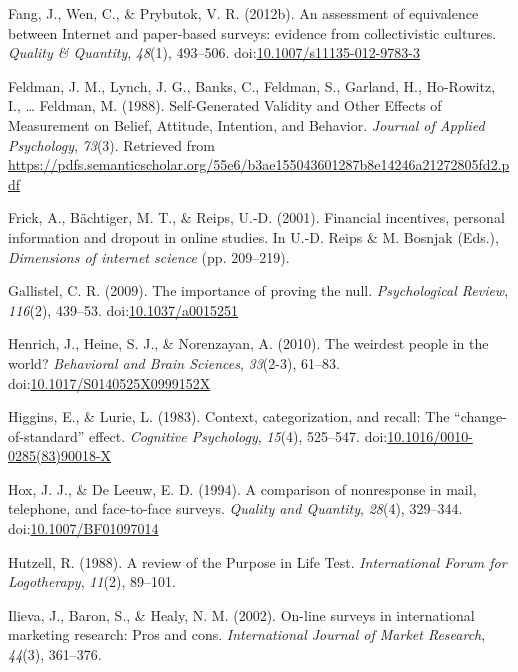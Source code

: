 \documentclass[english,man, mask]{apa6}
\theoremstyle{definition}
\theoremstyle{definition}
\theoremstyle{definition}
\theoremstyle{remark}
\begin{document}
\hypertarget{ref-Fang2012}{}
Fang, J., Wen, C., \& Prybutok, V. R. (2012b). An assessment of
equivalence between Internet and paper-based surveys: evidence from
collectivistic cultures. \emph{Quality \& Quantity}, \emph{48}(1),
493--506.
doi:\href{https://doi.org/10.1007/s11135-012-9783-3}{10.1007/s11135-012-9783-3}

\hypertarget{ref-Feldman1988}{}
Feldman, J. M., Lynch, J. G., Banks, C., Feldman, S., Garland, H.,
Ho-Rowitz, I., \ldots{} Feldman, M. (1988). Self-Generated Validity and
Other Effects of Measurement on Belief, Attitude, Intention, and
Behavior. \emph{Journal of Applied Psychology}, \emph{73}(3). Retrieved
from
\url{https://pdfs.semanticscholar.org/55e6/b3ae155043601287b8e14246a21272805fd2.pdf}

\hypertarget{ref-Frick2001}{}
Frick, A., Bächtiger, M. T., \& Reips, U.-D. (2001). Financial
incentives, personal information and dropout in online studies. In U.-D.
Reips \& M. Bosnjak (Eds.), \emph{Dimensions of internet science} (pp.
209--219).

\hypertarget{ref-Gallistel2009}{}
Gallistel, C. R. (2009). The importance of proving the null.
\emph{Psychological Review}, \emph{116}(2), 439--53.
doi:\href{https://doi.org/10.1037/a0015251}{10.1037/a0015251}

\hypertarget{ref-Henrich2010}{}
Henrich, J., Heine, S. J., \& Norenzayan, A. (2010). The weirdest people
in the world? \emph{Behavioral and Brain Sciences}, \emph{33}(2-3),
61--83.
doi:\href{https://doi.org/10.1017/S0140525X0999152X}{10.1017/S0140525X0999152X}

\hypertarget{ref-Higgins1983}{}
Higgins, E., \& Lurie, L. (1983). Context, categorization, and recall:
The ``change-of-standard'' effect. \emph{Cognitive Psychology},
\emph{15}(4), 525--547.
doi:\href{https://doi.org/10.1016/0010-0285(83)90018-X}{10.1016/0010-0285(83)90018-X}

\hypertarget{ref-Hox1994}{}
Hox, J. J., \& De Leeuw, E. D. (1994). A comparison of nonresponse in
mail, telephone, and face-to-face surveys. \emph{Quality and Quantity},
\emph{28}(4), 329--344.
doi:\href{https://doi.org/10.1007/BF01097014}{10.1007/BF01097014}

\hypertarget{ref-Hutzell1988}{}
Hutzell, R. (1988). A review of the Purpose in Life Test.
\emph{International Forum for Logotherapy}, \emph{11}(2), 89--101.

\hypertarget{ref-Ilieva2001}{}
Ilieva, J., Baron, S., \& Healy, N. M. (2002). On-line surveys in
international marketing research: Pros and cons. \emph{International
Journal of Market Research}, \emph{44}(3), 361--376.
\end{document}
